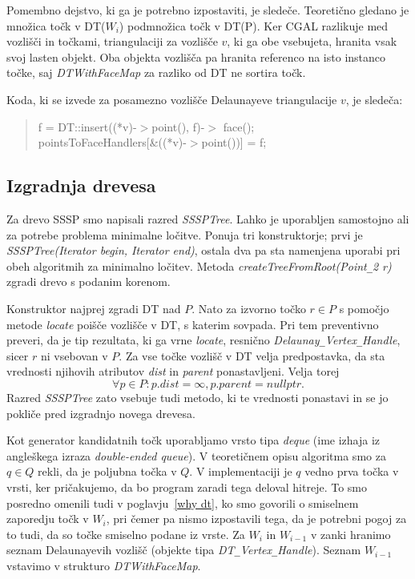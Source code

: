 \documentclass[a4paper, 12pt]{book}
\newcommand{\U}{\texttt{\_}}
\begin{document}
Pomembno dejstvo, ki ga je potrebno izpostaviti, je sledeče. Teoretično gledano je množica točk v DT($W_i$) podmnožica točk v DT(P). Ker CGAL razlikuje med vozlišči in točkami, triangulaciji za vozlišče $v$, ki ga obe vsebujeta, hranita vsak svoj lasten objekt. Oba objekta vozlišča pa hranita referenco na isto instanco točke, saj \textit{DTWithFaceMap} za razliko od DT ne sortira točk.

Koda, ki se izvede za posamezno vozlišče Delaunayeve triangulacije $v$, je sledeča:
\begin{quote}
f = DT::insert((*v)-$>$point(), f)-$>$ face();\\
pointsToFaceHandlers[\&((*v)-$>$point())] = f;
\end{quote}
\subsection{Izgradnja drevesa} 

Za drevo SSSP smo napisali razred \textit{SSSPTree}. Lahko je uporabljen samostojno ali za potrebe problema minimalne ločitve. Ponuja tri konstruktorje; prvi je \textit{SSSP\-Tree(Iterator begin, Iterator end)}, ostala dva pa sta namenjena uporabi pri obeh algoritmih za minimalno ločitev. Metoda \textit{createTreeFromRo\-ot\-(Point\U 2 r)} zgradi drevo s podanim korenom. 

Konstruktor najprej zgradi DT nad $P$. Nato za izvorno točko $r\in P$ s pomočjo metode \textit{locate} poišče vozlišče v DT, s katerim sovpada. Pri tem preventivno preveri, da je tip rezultata, ki ga vrne \textit{locate}, resnično \textit{Delaunay\U Ver\-tex\U Handle}, sicer $r$ ni vsebovan v $P$. Za vse točke vozlišč v DT velja predpostavka, da sta vrednosti njihovih atributov \textit{dist} in \textit{parent} ponastavljeni. Velja torej
\[
	\forall p\in P: p.dist = \infty,  p.parent = nullptr.
\]
Razred \textit{SSSPTree} zato vsebuje tudi metodo, ki te vrednosti ponastavi in se jo pokliče pred izgradnjo novega drevesa.

Kot generator kandidatnih točk uporabljamo vrsto tipa \textit{deque} (ime izhaja iz angleškega izraza \textit{double-ended queue}). V teoretičnem opisu algoritma smo za $q\in Q$ rekli, da je poljubna točka v $Q$. V implementaciji je $q$ vedno prva točka v vrsti, ker pričakujemo, da bo program zaradi tega deloval hitreje. To smo posredno omenili tudi v poglavju~\ref{why dt}, ko smo govorili o smiselnem zaporedju točk v $W_i$, pri čemer pa nismo izpostavili tega, da je potrebni pogoj za to tudi, da so točke smiselno podane iz vrste. Za $W_i$ in $W_{i-1}$ v zanki hranimo seznam Delaunayevih vozlišč (objekte tipa \textit{DT\U Vertex\U Handle}). Seznam $W_{i-1}$ vstavimo v strukturo \textit{DTWithFaceMap}. 
\end{document}
